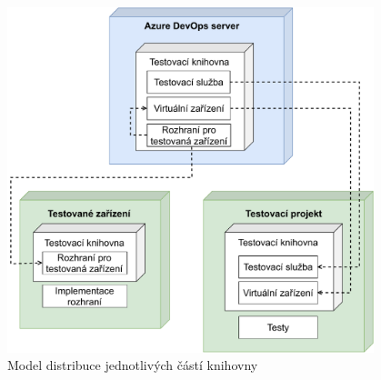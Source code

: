 \begin{figure}[htbp]
    \centering 
    \includegraphics[width=0.95\textwidth]{assets/img/deploymentmodel.pdf}
    \caption{Model distribuce jednotlivých částí knihovny}
    \label{fig:deploymodel}
\end{figure}